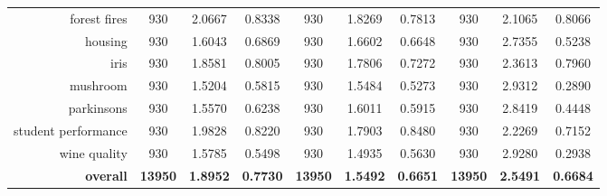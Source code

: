 \begin{table}[htbp]
{\begin{tabular}{rccccccccc}
			forest fires                        & 930                                         & 2.0667                                                                    & 0.8338          & 930            & \cellcolor[rgb]{ .776,  .937,  .808}\textcolor[rgb]{ 0,  .38,  0}{1.8269}          & 0.7813          & 930            & 2.1065          & 0.8066          \\
			housing                             & 930                                         & \cellcolor[rgb]{ .776,  .937,  .808}\textcolor[rgb]{ 0,  .38,  0}{1.6043} & 0.6869          & 930            & 1.6602                                                                             & 0.6648          & 930            & 2.7355          & 0.5238          \\
			iris                                & 930                                         & 1.8581                                                                    & 0.8005          & 930            & \cellcolor[rgb]{ .776,  .937,  .808}\textcolor[rgb]{ 0,  .38,  0}{1.7806}          & 0.7272          & 930            & 2.3613          & 0.7960          \\
			mushroom                            & 930                                         & \cellcolor[rgb]{ .776,  .937,  .808}\textcolor[rgb]{ 0,  .38,  0}{1.5204} & 0.5815          & 930            & 1.5484                                                                             & 0.5273          & 930            & 2.9312          & 0.2890          \\
			parkinsons                          & 930                                         & \cellcolor[rgb]{ .776,  .937,  .808}\textcolor[rgb]{ 0,  .38,  0}{1.5570} & 0.6238          & 930            & 1.6011                                                                             & 0.5915          & 930            & 2.8419          & 0.4448          \\
			student performance                 & 930                                         & 1.9828                                                                    & 0.8220          & 930            & \cellcolor[rgb]{ .776,  .937,  .808}\textcolor[rgb]{ 0,  .38,  0}{1.7903}          & 0.8480          & 930            & 2.2269          & 0.7152          \\
			wine quality                        & 930                                         & 1.5785                                                                    & 0.5498          & 930            & \cellcolor[rgb]{ .776,  .937,  .808}\textcolor[rgb]{ 0,  .38,  0}{1.4935}          & 0.5630          & 930            & 2.9280          & 0.2938          \\
			\midrule
			\textbf{overall}                    & \textbf{13950}                              & \textbf{1.8952}                                                           & \textbf{0.7730} & \textbf{13950} & \cellcolor[rgb]{ .776,  .937,  .808}\textcolor[rgb]{ 0,  .38,  0}{\textbf{1.5492}} & \textbf{0.6651} & \textbf{13950} & \textbf{2.5491} & \textbf{0.6684} \\
		\end{tabular}%
	}
\end{table}%



